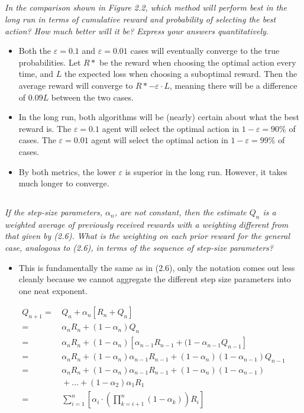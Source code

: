 \documentclass{article}
\begin{document}
\subsection{}
\textit{In the comparison shown in Figure 2.2, which method will perform best in the long run in terms of cumulative reward and probability of selecting the best action? How much better will it be? Express your answers quantitatively.}
\begin{itemize}
\item Both the $\varepsilon = 0.1$ and $\varepsilon = 0.01$ cases will eventually converge to the true probabilities. Let $R*$ be the reward when choosing the optimal action every time, and $L$ the expected loss when choosing a suboptimal reward. Then the average reward will converge to $R* - \varepsilon \cdot L$, meaning there will be a difference of $0.09 L$ between the two cases.
\item In the long run, both algorithms will be (nearly) certain about what the best reward is. The $\varepsilon = 0.1$ agent will select the optimal action in $1 - \varepsilon = 90\%$ of cases. The $\varepsilon = 0.01$ agent will select the optimal action in $1 - \varepsilon = 99\%$ of cases. 
\item By both metrics, the lower $\varepsilon$ is superior in the long run. However, it takes much longer to converge.
\end{itemize}

\subsection{}
\textit{If the step-size parameters, $\alpha_n$, are not constant, then the estimate $Q_n$ is a weighted average of previously received rewards with a weighting different from that given by (2.6). What is the weighting on each prior reward for the general case, analogous to (2.6), in terms of the sequence of step-size parameters?}
\begin{itemize}
\item This is fundamentally the same as in (2.6), only the notation comes out less cleanly because we cannot aggregate the different step size parameters into one neat exponent.
\end{itemize}
\begin{align}
Q_{n+1} =&\, Q_n + \alpha_n [R_n + Q_n] \\
= &\, \alpha_n R_n + (1-\alpha_n) Q_n \\
=&\, \alpha_n  R_n + (1-\alpha_n)[\alpha_{n-1} R_{n-1} + (1-\alpha_{n-1} Q_{n-1}] \\
= &\, \alpha_n R_n + (1-\alpha_n) \alpha_{n-1} R_{n-1} + (1-\alpha_n)(1-\alpha_{n-1}) Q_{n-1} \\
= &\, \alpha_n R_n + (1-\alpha_n) \alpha_{n-1} R_{n-1} + (1-\alpha_n)(1-\alpha_{n-1})\\
 &\, + ... + (1-\alpha_2) \alpha_1 R_1\\
= &\, \sum_{i=1}^{n} \left[\alpha_i \cdot \left(\prod_{k=i+1}^{n} (1-\alpha_k)\right) R_i\right]
\end{align}
\end{document}
